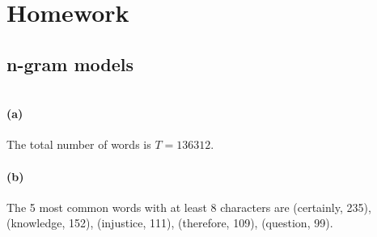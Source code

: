 \documentclass[12pt]{article}
\begin{document}

\section{Homework}
\subsection{n-gram models}
\inputminted[breaklines=true, linenos=true]{python}{./Homework3/ex1.py}
\paragraph{(a)}
The total number of words is \(T=136312\).
\paragraph{(b)}
The 5 most common words with at least 8 characters are
(certainly, 235), (knowledge, 152), (injustice, 111), (therefore, 109), (question, 99).
\end{document}
